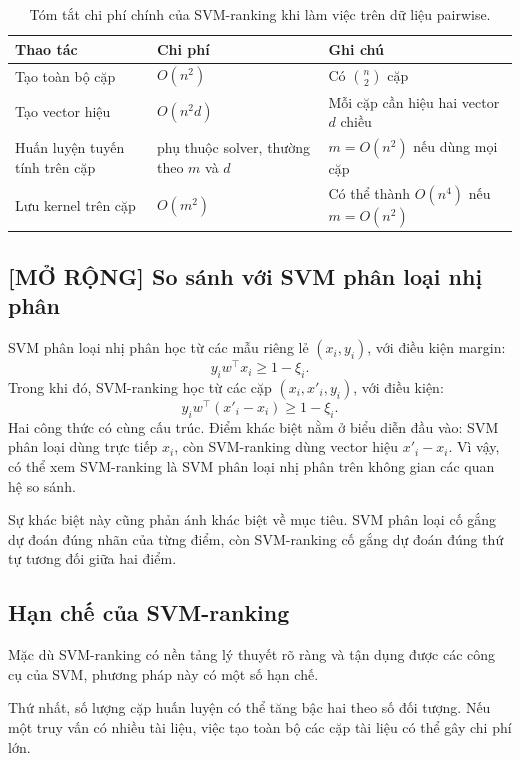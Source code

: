 \begin{table}[H]
    \centering
    \begin{tabular}{lll}
        \toprule
        \textbf{Thao tác} & \textbf{Chi phí} & \textbf{Ghi chú} \\
        \midrule
        Tạo toàn bộ cặp & \(O(n^2)\) & Có \(\binom{n}{2}\) cặp \\
        Tạo vector hiệu & \(O(n^2d)\) & Mỗi cặp cần hiệu hai vector \(d\) chiều \\
        Huấn luyện tuyến tính trên cặp & phụ thuộc solver, thường theo \(m\) và \(d\) & \(m=O(n^2)\) nếu dùng mọi cặp \\
        Lưu kernel trên cặp & \(O(m^2)\) & Có thể thành \(O(n^4)\) nếu \(m=O(n^2)\) \\
        \bottomrule
    \end{tabular}
    \caption{Tóm tắt chi phí chính của SVM-ranking khi làm việc trên dữ liệu pairwise.}
    \label{tab:section4-svm-ranking-complexity}
\end{table}

\subsection{[MỞ RỘNG] So sánh với SVM phân loại nhị phân}

SVM phân loại nhị phân học từ các mẫu riêng lẻ \((x_i,y_i)\), với điều kiện margin:
\[
    y_i w^\top x_i \geq 1-\xi_i.
\]
Trong khi đó, SVM-ranking học từ các cặp \((x_i,x'_i,y_i)\), với điều kiện:
\[
    y_i w^\top(x'_i-x_i)\geq 1-\xi_i.
\]
Hai công thức có cùng cấu trúc. Điểm khác biệt nằm ở biểu diễn đầu vào: SVM phân loại dùng trực tiếp \(x_i\), còn SVM-ranking dùng vector hiệu \(x'_i-x_i\). Vì vậy, có thể xem SVM-ranking là SVM phân loại nhị phân trên không gian các quan hệ so sánh.

Sự khác biệt này cũng phản ánh khác biệt về mục tiêu. SVM phân loại cố gắng dự đoán đúng nhãn của từng điểm, còn SVM-ranking cố gắng dự đoán đúng thứ tự tương đối giữa hai điểm.

\subsection{Hạn chế của SVM-ranking}

Mặc dù SVM-ranking có nền tảng lý thuyết rõ ràng và tận dụng được các công cụ của SVM, phương pháp này có một số hạn chế.

Thứ nhất, số lượng cặp huấn luyện có thể tăng bậc hai theo số đối tượng. Nếu một truy vấn có nhiều tài liệu, việc tạo toàn bộ các cặp tài liệu có thể gây chi phí lớn.

